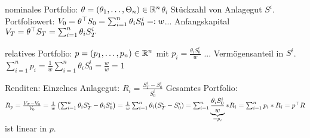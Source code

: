 \begin{*bemerkung}
	nominales Portfolio: $\theta = (\theta_1, \dots, \Theta_n) \in \mathbb{R}^n$$\theta_i$ Stückzahl von Anlagegut $S^i$.
	Portfoliowert: $V_0 = \theta^{\top} S_0 = \sum_{i=1}^n \theta_i S_0^i \mathrel{=:} w$... Anfangskapital
	$V_T = \theta^{\top} S_T = \sum_{i=1}^n \theta_i S_T^i$
	
	relatives Portfolio: $p = (p_1, \dots, p_n) \in \mathbb{R}^n$ mit $p_i = \frac{\theta_i S_0^i}{w}$ ... Vermögensanteil in $S^i$.
	$\sum_{i=1}^n p_i = \frac{1}{w} \sum_{i=1}^n \theta_i S_0^i = \frac{w}{w} = 1$
	
	Renditen: Einzelnes Anlagegut: $R_i = \frac{S_T^i - S_0^i}{S_0^i}$
	Gesamtes Portfolio: $R_p = \frac{V_T - V_0}{V_0} = \frac{1}{w} \left( \sum_{i=1}^n \theta_i S_T^i - \theta_i S_0^i \right)
	= \frac{1}{w} \sum_{i=1}^n \theta_i (S_T^i - S_0^i)
	= \sum_{i=1}^n \underbrace{\frac{\theta_i S_0^i}{w}}_{= p_i} * R_i
	= \sum_{i=1}^n p_i * R_i
	= p^{\top} R$ ist linear in $p$.
\end{*bemerkung}
